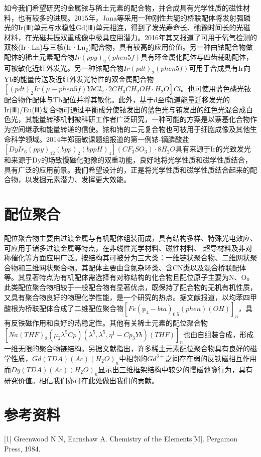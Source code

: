 \documentclass[UTF8,a4paper,10pt,twocolumn]{ctexart}
\begin{document}
如今我们希望研究的金属铱与稀土元素的配合物，并合成具有光学性质的磁性材料，也有较多的进展。2015年，Jana等采用一种刚性共轭的桥联配体将发射强磷光的Ir(Ⅲ)单元与水稳性Gd(Ⅲ)单元相连，得到了发光寿命长、弛豫时间长的光磁材料，在光磁共振双重成像中极具应用潜力。2016年其又报道了可用于氧气检测的双核(Ir·Ln)与三核(Ir·Ln$_2$)配合物，具有较高的应用价值。另一种由铱配合物做配体的稀土元素配合物$Ir(ppy)_2(phen5f)$具有环金属化配体与四齿辅助配体，可被敏化近红外发光。另一种铱配合物$Ir(pdt)_2(phen5f)$可用于合成具有Ir向Yb的能量传送及近红外发光特性的双金属配合物$[(pdt)_2Ir(\mu-phen5f)YbCl_2\cdot 2CH_3CH_2OH\cdot H_2O]Cl$。也可使用蓝色磷光铱配合物作配体与Tb配位并将其敏化。此外，基于d至f轨道能量迁移发光的Ir(Ⅲ)/Eu(Ⅲ)复合物可通过平衡成分使铱发出的蓝色光与铕发出的红色光混合成白色光，其能量转移机制被科研工作者广泛研究，一种可能的方案是以萘基化合物作为空间继承和能量转递的信使。铱和铕的二元复合物也可被用于细胞成像及其他生命科学领域。2014年郑丽敏课题组报道的第一例铱-镝膦酸盐$[DyIr_6(ppy)_{12}(bpp)_2(bppH)_4](CF_3SO_3)\cdot 8H_2O$具有来源于Ir的光致发光和来源于Dy的场致慢磁化弛豫的双重功能，良好地将光学性质和磁学性质结合，具有广泛的应用前景。我们希望设计的，正是将光学性质和磁学性质结合起来的配合物，以发掘元素潜力、发挥更大效能。

\section{配位聚合}

配位聚合物主要由过渡金属与有机配体组装而成，具有结构多样、特殊光电效应、可应用于诸多过渡金属等特点，在非线性光学材料、磁性材料、 超导材料及非对称催化等方面应用广泛。按结构其可被分为三大类：一维链状聚合物、二维网状聚合物和三维网状聚合物。其配体主要由含氮杂环类、含CN类以及混合桥联配体等。其显著特点为有机配体需选择有对称结构的化合物且配位原子主要为N、O。此类配位聚合物相较于一般配合物有显著优点，既保持了配合物的无机有机性质，又具有聚合物良好的物理化学性能，是一个研究的热点。据文献报道，以均苯四甲酸根为桥联配体合成了二维配位聚合物$[Fe(µ_4-bta)_{0.5}(phen)(OH)]_n$，具有反铁磁作用和良好的热稳定性。其他有关稀土元素的配位聚合物$[Na(THF)_2(\mu_2\lambda^5Cp)(\lambda^5,\lambda^5,\eta^1-Cp_3Yb)(THF)]_n$也由自组装合成，形成一维无限的聚合物链结构。另据文献指出，许多稀土元素配位聚合物具有良好的磁学性质，${Gd(TDA)(Ac)(H_2O)}_n$中相邻的$Gd^{3+}$之间存在弱的反铁磁相互作用而${Dy(TDA)(Ac)(H_2O)}_n$显示出三维框架结构中较少的慢磁弛豫行为，具有研究价值。相信我们亦可在此处做出我们的贡献。

\section{参考资料}
\noindent{}[1] Greenwood N N, Earnshaw A. Chemistry of the Elements[M]. Pergamon Press, 1984.
\end{document}
